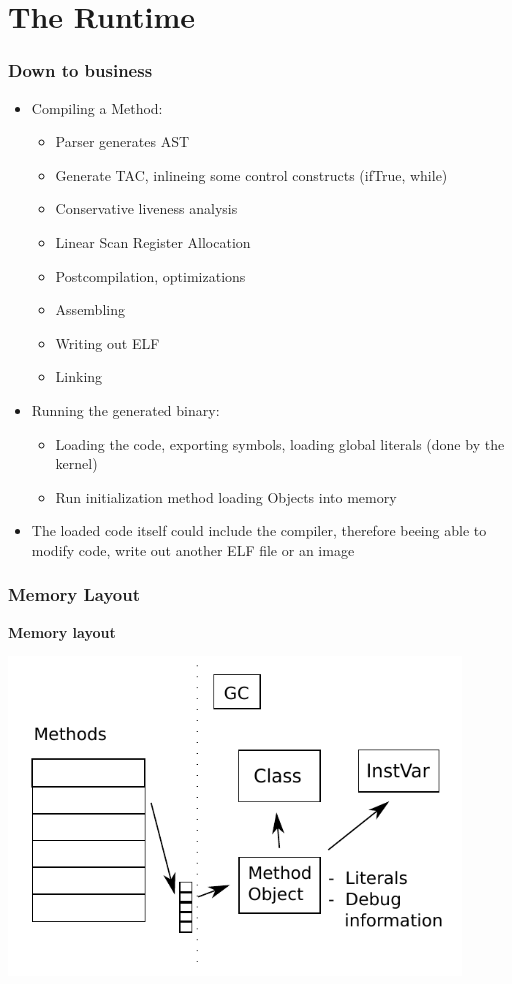 \documentclass{beamer}
\begin{document}
\section{The Runtime}

\begin{frame}[fragile]
    \frametitle{Down to business}
    \begin{itemize}
        \item Compiling a Method:
        \begin{itemize}
            \item Parser generates AST
            \item Generate TAC, inlineing some control constructs (ifTrue, while)
            \item Conservative liveness analysis
            \item Linear Scan Register Allocation
            \item Postcompilation, optimizations
            \item Assembling
            \item Writing out ELF
            \item Linking
        \end{itemize}
        \item Running the generated binary:
        \begin{itemize}
            \item Loading the code, exporting symbols, loading global literals (done by the kernel)
            \item Run initialization method loading Objects into memory
        \end{itemize}
        \item The loaded code itself could include the compiler, therefore beeing able to modify code, write out another ELF file or an image
    \end{itemize}
\end{frame}

\begin{frame}[fragile]
    \frametitle{Memory Layout}
    {\bf Memory layout }
    \begin{center}\includegraphics[width=0.9\textwidth]{memory.pdf}\end{center}
\end{frame}
\end{document}
